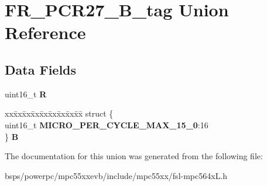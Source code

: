 \hypertarget{unionFR__PCR27__16B__tag}{}\section{F\+R\+\_\+\+P\+C\+R27\+\_\+B\+\_\+tag Union Reference}
\label{unionFR__PCR27__16B__tag}
\subsection*{Data Fields}
\begin{DoxyCompactItemize}
\item 
\mbox{\label{unionFR__PCR27__16B__tag_ad5984e587e3f2a0403d3068e902a6dc3}} 
uint16\+\_\+t {\bfseries R}
\item 
\mbox{\label{unionFR__PCR27__16B__tag_a9fd6ffb5b755ba904a34b6019d12045f}} 
\begin{tabbing}
xx\=xx\=xx\=xx\=xx\=xx\=xx\=xx\=xx\=\kill
struct \{\\
\>uint16\_t {\bfseries MICRO\_PER\_CYCLE\_MAX\_15\_0}:16\\
\} {\bfseries B}\\

\end{tabbing}\end{DoxyCompactItemize}


The documentation for this union was generated from the following file\+:\begin{DoxyCompactItemize}
\item 
bsps/powerpc/mpc55xxevb/include/mpc55xx/fsl-\/mpc564x\+L.\+h\end{DoxyCompactItemize}

